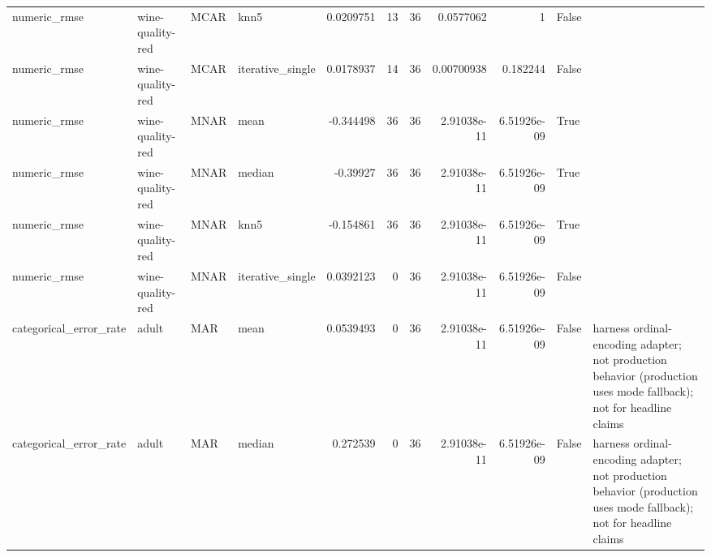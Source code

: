 \begin{table}[ht]
\begin{tabular}{llllrrrrrll}
 numeric\_rmse           & wine-quality-red     & MCAR        & knn5             &      0.0209751   &                  13 &      36 & 0.0577062   & 1           & False              &                                                                                                                    \\
 numeric\_rmse           & wine-quality-red     & MCAR        & iterative\_single &      0.0178937   &                  14 &      36 & 0.00700938  & 0.182244    & False              &                                                                                                                    \\
 numeric\_rmse           & wine-quality-red     & MNAR        & mean             &     -0.344498    &                  36 &      36 & 2.91038e-11 & 6.51926e-09 & True               &                                                                                                                    \\
 numeric\_rmse           & wine-quality-red     & MNAR        & median           &     -0.39927     &                  36 &      36 & 2.91038e-11 & 6.51926e-09 & True               &                                                                                                                    \\
 numeric\_rmse           & wine-quality-red     & MNAR        & knn5             &     -0.154861    &                  36 &      36 & 2.91038e-11 & 6.51926e-09 & True               &                                                                                                                    \\
 numeric\_rmse           & wine-quality-red     & MNAR        & iterative\_single &      0.0392123   &                   0 &      36 & 2.91038e-11 & 6.51926e-09 & False              &                                                                                                                    \\
 categorical\_error\_rate & adult                & MAR         & mean             &      0.0539493   &                   0 &      36 & 2.91038e-11 & 6.51926e-09 & False              & harness ordinal-encoding adapter; not production behavior (production uses mode fallback); not for headline claims \\
 categorical\_error\_rate & adult                & MAR         & median           &      0.272539    &                   0 &      36 & 2.91038e-11 & 6.51926e-09 & False              & harness ordinal-encoding adapter; not production behavior (production uses mode fallback); not for headline claims \\

\end{tabular}
\end{table}
